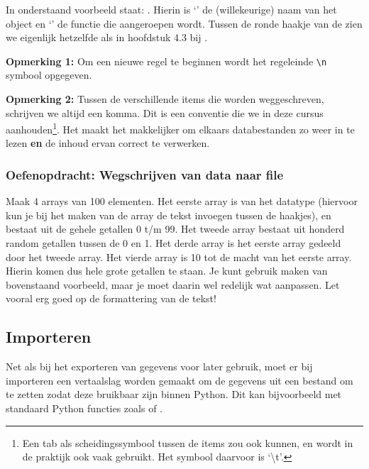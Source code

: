\documentclass[a4paper,11pt, fleqn]{article}
\begin{document}
In onderstaand voorbeeld staat: . 
Hierin is `' de (willekeurige) naam van het object en `' de functie die aangeroepen wordt. Tussen de ronde haakje van de  zien we eigenlijk hetzelfde als in hoofdstuk 4.3 bij .


{\bf Opmerking 1:} Om een nieuwe regel te beginnen wordt het regeleinde \verb,\n, symbool opgegeven.

{\bf Opmerking 2:} Tussen de verschillende items die worden weggeschreven, schrijven we altijd een komma. Dit is een conventie die we in deze cursus aanhouden\footnote{Een tab als scheidingssymbool tussen de items zou ook kunnen, en wordt in de praktijk ook vaak gebruikt. Het symbool daarvoor is `\textbackslash t'.}.
Het maakt het makkelijker om elkaars databestanden zo weer in te lezen {\bf en} de inhoud ervan correct te verwerken. 

\subsubsection*{Oefenopdracht: Wegschrijven van data naar file}
Maak 4 arrays van 100 elementen. Het eerste array is van het datatype  (hiervoor kun je bij het maken van de array de tekst  invoegen tussen de haakjes), en bestaat uit de gehele getallen 0 t/m 99. Het tweede array bestaat uit honderd random getallen tussen de 0 en 1. Het derde array is het eerste array gedeeld door het tweede array. Het vierde array is 10 tot de macht van het eerste array. Hierin komen dus hele grote getallen te staan. Je kunt gebruik maken van bovenstaand voorbeeld, maar je moet daarin wel redelijk wat aanpassen. Let vooral erg goed op de formattering van de tekst!

\subsection{Importeren}
\label{Ch_Importeren}
Net als bij het exporteren van gegevens voor later gebruik, moet er bij importeren een vertaalslag worden gemaakt om de gegevens uit een bestand om te zetten zodat deze bruikbaar zijn binnen Python. Dit kan bijvoorbeeld met standaard Python functies zoals  of . 
\end{document}
